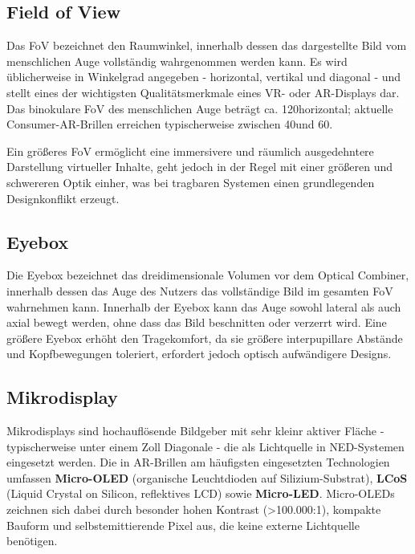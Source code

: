 \subsection{Field of View}
\label{subsec:FoV}
Das \ac{FoV} bezeichnet den Raumwinkel, innerhalb dessen das dargestellte Bild vom menschlichen Auge vollständig wahrgenommen werden kann. Es wird üblicherweise in Winkelgrad angegeben - horizontal, vertikal und diagonal - und stellt eines der wichtigsten Qualitätsmerkmale eines \ac{VR}- oder \ac{AR}-Displays dar. Das binokulare \ac{FoV} des menschlichen Auge beträgt ca. 120\textdegree horizontal; aktuelle Consumer-\ac{AR}-Brillen erreichen typischerweise zwischen 40\textdegree und 60\textdegree.\autocite[vgl. S.30 ff.]{cOpticalArchitecturesAugmented}

\newpage

Ein größeres FoV ermöglicht eine immersivere und räumlich ausgedehntere Darstellung virtueller Inhalte, geht jedoch in der Regel mit einer größeren und schwereren Optik einher, was bei tragbaren Systemen einen grundlegenden Designkonflikt erzeugt.\autocite[vgl.]{xiongAugmentedRealityVirtual2021}

\subsection{Eyebox}
\label{subsec:Eyebox}
Die Eyebox bezeichnet das dreidimensionale Volumen vor dem Optical Combiner, innerhalb dessen das Auge des Nutzers das vollständige Bild im gesamten \ac{FoV} wahrnehmen kann. Innerhalb der Eyebox kann das Auge sowohl lateral als auch axial bewegt werden, ohne dass das Bild beschnitten oder verzerrt wird. Eine größere Eyebox erhöht den Tragekomfort, da sie größere interpupillare Abstände und Kopfbewegungen toleriert, erfordert jedoch optisch aufwändigere Designs.\autocite[vgl. S.37 ff.]{cOpticalArchitecturesAugmented}

\subsection{Mikrodisplay}
\label{subsec:Mikrodisplay}
Mikrodisplays sind hochauflösende Bildgeber mit sehr kleinr aktiver Fläche - typischerweise unter einem Zoll Diagonale - die als Lichtquelle in \ac{NED}-Systemen eingesetzt werden. Die in \ac{AR}-Brillen am häufigsten eingesetzten Technologien umfassen \textbf{Micro-OLED} (organische Leuchtdioden auf Silizium-Substrat), \textbf{LCoS} (Liquid Crystal on Silicon, reflektives LCD) sowie \textbf{Micro-LED}. Micro-OLEDs zeichnen sich dabei durch besonder hohen Kontrast (>100.000:1), kompakte Bauform und selbstemittierende Pixel aus, die keine externe Lichtquelle benötigen.\autocite[vgl.]{luoCompactHighEfficiencyLiquidCrystalSilicon2024}

